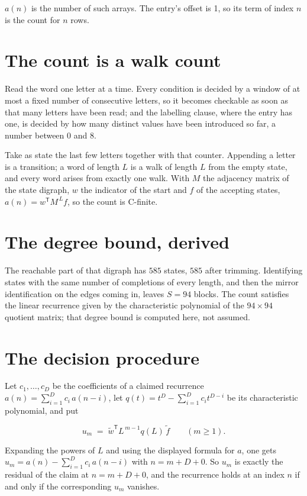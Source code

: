 \documentclass[11pt]{article}
\theoremstyle{definition}
\begin{document}
$a(n)$ is the number of such arrays. The entry's offset is 1, so its term of index $n$ is the count for $n$ rows.

\section{The count is a walk count}

Read the word one letter at a time. Every condition is decided by a window of at most a fixed number of consecutive letters, so it becomes checkable as soon as that many letters have been read; and the labelling clause, where the entry has one, is decided by how many distinct values have been introduced so far, a number between $0$ and 8.

Take as state the last few letters together with that counter. Appending a letter is a transition; a word of length $L$ is a walk of length $L$ from the empty state, and every word arises from exactly one walk. With $M$ the adjacency matrix of the state digraph, $w$ the indicator of the start and $f$ of the accepting states, $a(n) = w^{\mathsf T}M^{\,L}f$, so the count is C-finite.

\section{The degree bound, derived}

The reachable part of that digraph has $585$ states, $585$ after trimming. Identifying states with the same number of completions of every length, and then the mirror identification on the edges coming in, leaves $S = 94$ blocks. The count satisfies the linear recurrence given by the characteristic polynomial of the $94\times94$ quotient matrix; that degree bound is computed here, not assumed.

\section{The decision procedure}

Let $c_1,\dots,c_D$ be the coefficients of a claimed recurrence $a(n) = \sum_{i=1}^{D} c_i\,a(n-i)$, let $q(t) = t^{D} - \sum_{i=1}^{D} c_i t^{D-i}$ be its characteristic polynomial, and put

\[u_m \;=\; \tilde w^{\mathsf T} L^{\,m-1} q(L)\,\tilde f \qquad (m \ge 1).\]

Expanding the powers of $L$ and using the displayed formula for $a$, one gets $u_m = a(n) - \sum_{i=1}^{D} c_i\,a(n-i)$ with $n = m + D + 0$. So $u_m$ is exactly the residual of the claim at $n = m + D + 0$, and the recurrence holds at an index $n$ if and only if the corresponding $u_m$ vanishes.
\end{document}
